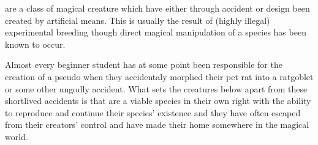 {
	 are a class of magical creature which have\comma{} either through accident or design\comma{} been created by artificial means. This is usually the result of (highly illegal) experimental breeding\comma{} though direct magical manipulation of a species has been known to occur. 

Almost every beginner  student has\comma{} at some point\comma{} been responsible for the creation of a pseudo\minus{}\comma{} when they accidentaly morphed their pet rat into a rat\minus{}goblet\comma{} or some other ungodly accident. What sets the creatures below apart from these short\minus{}lived accidents is that  are a viable species in their own right\comma{} with the ability to reproduce and continue their species’ existence\comma{} and they have often escaped from their creators’ control\comma{} and have made their home somewhere in the magical world.
}
